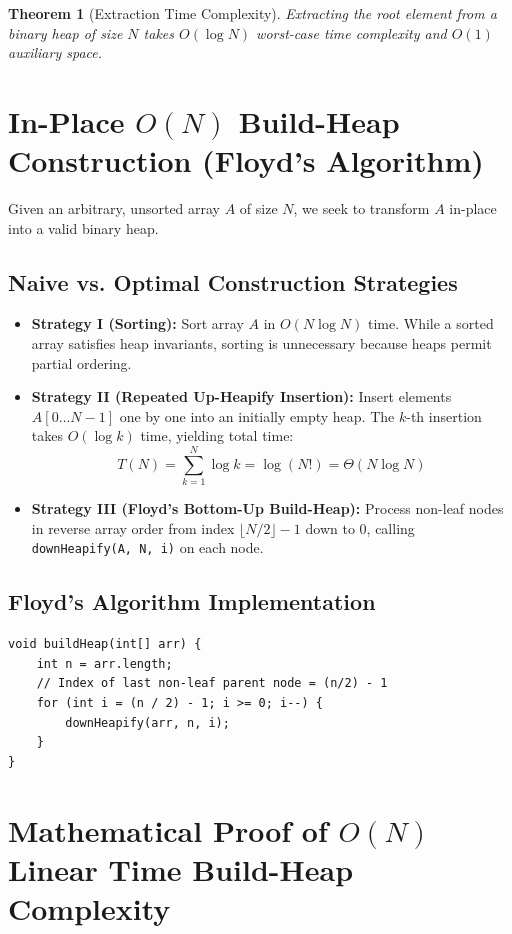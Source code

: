 \documentclass[10pt,journal,compsoc,onecolumn]{IEEEtran}
\newtheorem{theorem}{Theorem}
\begin{document}
\begin{theorem}[Extraction Time Complexity]
Extracting the root element from a binary heap of size $N$ takes $O(\log N)$ worst-case time complexity and $O(1)$ auxiliary space.
\end{theorem}

\section{In-Place $O(N)$ Build-Heap Construction (Floyd's Algorithm)}
\label{sec:build-heap}

Given an arbitrary, unsorted array $A$ of size $N$, we seek to transform $A$ in-place into a valid binary heap.

\subsection{Naive vs. Optimal Construction Strategies}
\begin{itemize}
    \item \textbf{Strategy I (Sorting):} Sort array $A$ in $O(N \log N)$ time. While a sorted array satisfies heap invariants, sorting is unnecessary because heaps permit partial ordering.
    \item \textbf{Strategy II (Repeated Up-Heapify Insertion):} Insert elements $A[0 \dots N-1]$ one by one into an initially empty heap. The $k$-th insertion takes $O(\log k)$ time, yielding total time:
    \[
    T(N) = \sum_{k=1}^{N} \log k = \log(N!) = \Theta(N \log N)
    \]
    \item \textbf{Strategy III (Floyd's Bottom-Up Build-Heap):} Process non-leaf nodes in reverse array order from index $\lfloor N/2 \rfloor - 1$ down to $0$, calling \texttt{downHeapify(A, N, i)} on each node.
\end{itemize}

\subsection{Floyd's Algorithm Implementation}
\begin{verbatim}
void buildHeap(int[] arr) {
    int n = arr.length;
    // Index of last non-leaf parent node = (n/2) - 1
    for (int i = (n / 2) - 1; i >= 0; i--) {
        downHeapify(arr, n, i);
    }
}
\end{verbatim}

\section{Mathematical Proof of $O(N)$ Linear Time Build-Heap Complexity}
\label{sec:math-proof}
\end{document}
